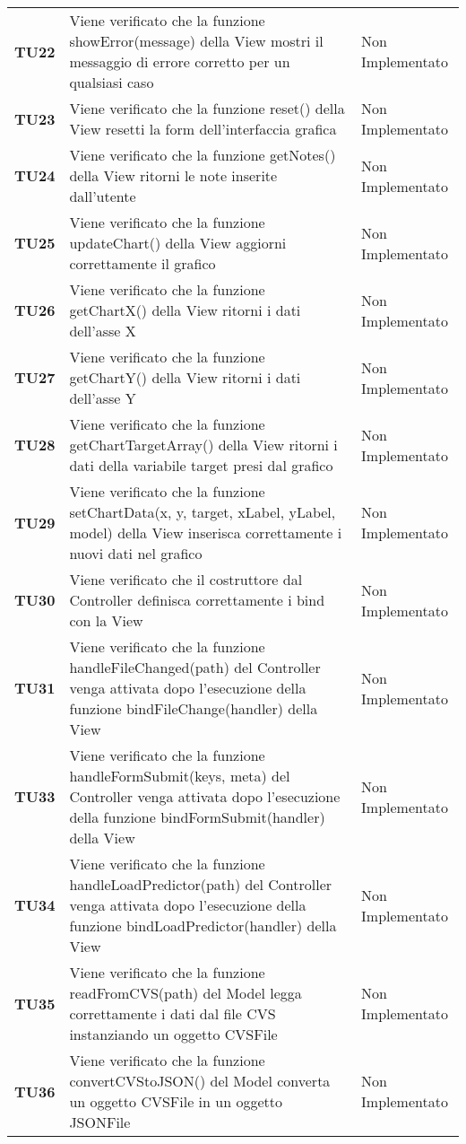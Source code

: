 \documentclass[../piano-di-qualifica.tex]{subfiles}
\begin{document}
\begin{longtable}[H]{>{\centering\bfseries}m{2.5cm} >{\centering}m{7.5cm} >{\centering\arraybackslash}m{3.5cm}}
  \textbf{TU22} & Viene verificato che la funzione showError(message) della View mostri il messaggio di errore corretto per un qualsiasi caso & Non Implementato \\
  \textbf{TU23} & Viene verificato che la funzione reset() della View resetti la form dell'interfaccia grafica & Non Implementato \\
  \textbf{TU24} & Viene verificato che la funzione getNotes() della View ritorni le note inserite dall'utente & Non Implementato \\
  \textbf{TU25} & Viene verificato che la funzione updateChart() della View aggiorni correttamente il grafico & Non Implementato \\
  \textbf{TU26} & Viene verificato che la funzione getChartX() della View ritorni i dati dell'asse X & Non Implementato \\
  \textbf{TU27} & Viene verificato che la funzione getChartY() della View ritorni i dati dell'asse Y & Non Implementato \\
  \textbf{TU28} & Viene verificato che la funzione getChartTargetArray() della View ritorni i dati della variabile target presi dal grafico & Non Implementato \\
  \textbf{TU29} & Viene verificato che la funzione setChartData(x, y, target, xLabel, yLabel, model) della View inserisca correttamente i nuovi dati nel grafico & Non Implementato \\
  \textbf{TU30} & Viene verificato che il costruttore dal Controller definisca correttamente i bind con la View & Non Implementato \\
  \textbf{TU31} & Viene verificato che la funzione handleFileChanged(path) del Controller venga attivata dopo l'esecuzione della funzione bindFileChange(handler) della View & Non Implementato \\
  \textbf{TU33} & Viene verificato che la funzione handleFormSubmit(keys, meta) del Controller venga attivata dopo l'esecuzione della funzione bindFormSubmit(handler) della View & Non Implementato \\
  \textbf{TU34} & Viene verificato che la funzione handleLoadPredictor(path) del Controller venga attivata dopo l'esecuzione della funzione bindLoadPredictor(handler) della View & Non Implementato \\
  \textbf{TU35} & Viene verificato che la funzione readFromCVS(path) del Model legga correttamente i dati dal file CVS instanziando un oggetto CVSFile & Non Implementato \\
  \textbf{TU36} & Viene verificato che la funzione convertCVStoJSON() del Model converta un oggetto CVSFile in un oggetto JSONFile & Non Implementato \\

\end{longtable}
\end{document}
